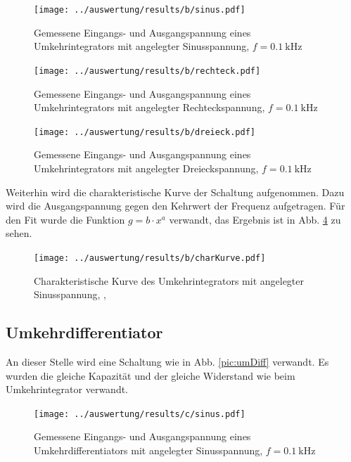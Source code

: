 \begin{figure}
	\centering
	\texttt{[image: ../auswertung/results/b/sinus.pdf]}
	\caption{Gemessene Eingangs- und Ausgangspannung eines Umkehrintegrators mit angelegter Sinusspannung, $f = 0.1\ \si{\kilo\hertz}$}
	\label{pic:b sinus}
\end{figure}

\begin{figure}
	\centering
	\texttt{[image: ../auswertung/results/b/rechteck.pdf]}
	\caption{Gemessene Eingangs- und Ausgangspannung eines Umkehrintegrators mit angelegter Rechteckspannung, $f = 0.1\ \si{\kilo\hertz}$}
	\label{pic:b rechteck}
\end{figure}

\begin{figure}
	\centering
	\texttt{[image: ../auswertung/results/b/dreieck.pdf]}
	\caption{Gemessene Eingangs- und Ausgangspannung eines Umkehrintegrators mit angelegter Dreieckspannung, $f = 0.1\ \si{\kilo\hertz}$}
	\label{pic:b dreieck}
\end{figure}

Weiterhin wird die charakteristische Kurve der Schaltung aufgenommen. Dazu wird die Ausgangspannung gegen den Kehrwert der Frequenz aufgetragen. Für den Fit wurde die Funktion $g = b \cdot x^a$ verwandt, das Ergebnis ist in Abb. \ref{pic:b charKurve} zu sehen.

\begin{figure}
	\centering
	\texttt{[image: ../auswertung/results/b/charKurve.pdf]}
	\caption{Charakteristische Kurve des Umkehrintegrators mit angelegter Sinusspannung, \protect, \protect }
	\label{pic:b charKurve}
\end{figure}

\subsection{Umkehrdifferentiator}
An dieser Stelle wird eine Schaltung wie in Abb. \ref{pic:umDiff} verwandt. Es wurden die gleiche Kapazität und der gleiche Widerstand wie beim Umkehrintegrator verwandt.

\begin{figure}
	\centering
	\texttt{[image: ../auswertung/results/c/sinus.pdf]}
	\caption{Gemessene Eingangs- und Ausgangspannung eines Umkehrdifferentiators mit angelegter Sinusspannung, $f = 0.1\ \si{\kilo\hertz}$}
	\label{pic:c sinus}
\end{figure}

